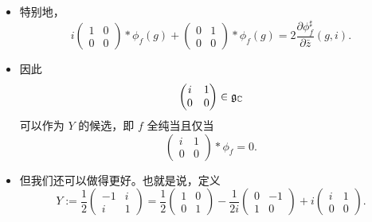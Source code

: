 \begin{itemize}
则 $\gamma_2(t)\cdot i=i+t$，于是
\[
\begin{pmatrix}0&1\\0&0\end{pmatrix}*\phi_f(g)
=\frac{\partial\phi_f^\sharp}{\partial z}(g,i)+\frac{\partial\phi_f^\sharp}{\partial\bar z}(g,i).
\]
\item 特别地，
\[
i\begin{pmatrix}1&0\\0&0\end{pmatrix}*\phi_f(g)+\begin{pmatrix}0&1\\0&0\end{pmatrix}*\phi_f(g)
=2\frac{\partial\phi_f^\sharp}{\partial\bar z}(g,i).
\]
\item 因此
\[
\begin{pmatrix}i&1\\0&0\end{pmatrix}\in\mathfrak{g}_{\mathbb{C}}
\]
可以作为 $Y$ 的候选，即 $f$ 全纯当且仅当
\[
\begin{pmatrix}i&1\\0&0\end{pmatrix}*\phi_f=0.
\]
\item 但我们还可以做得更好。也就是说，定义
\[
Y:=\frac12\begin{pmatrix}-1&i\\i&1\end{pmatrix}
=\frac12\begin{pmatrix}1&0\\0&1\end{pmatrix}-\frac{1}{2i}\begin{pmatrix}0&-1\\1&0\end{pmatrix}
+i\begin{pmatrix}i&1\\0&0\end{pmatrix}.
\]
\end{itemize}

